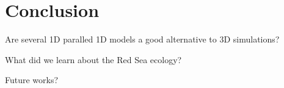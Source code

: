 \section{Conclusion}

Are several 1D paralled 1D models a good alternative to 3D simulations?

What did we learn about the Red Sea ecology?

Future works?
